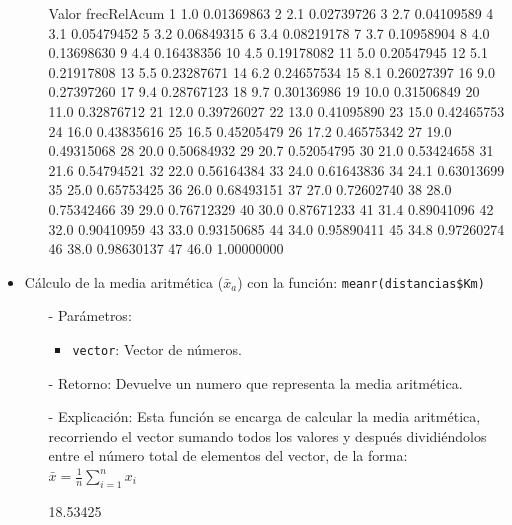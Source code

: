 \documentclass[a4paper, 12pt]{article}
\begin{document}
\begin{itemize}
\begin{itemize}
\begin{Schunk}
\begin{Soutput}
   Valor frecRelAcum
1    1.0  0.01369863
2    2.1  0.02739726
3    2.7  0.04109589
4    3.1  0.05479452
5    3.2  0.06849315
6    3.4  0.08219178
7    3.7  0.10958904
8    4.0  0.13698630
9    4.4  0.16438356
10   4.5  0.19178082
11   5.0  0.20547945
12   5.1  0.21917808
13   5.5  0.23287671
14   6.2  0.24657534
15   8.1  0.26027397
16   9.0  0.27397260
17   9.4  0.28767123
18   9.7  0.30136986
19  10.0  0.31506849
20  11.0  0.32876712
21  12.0  0.39726027
22  13.0  0.41095890
23  15.0  0.42465753
24  16.0  0.43835616
25  16.5  0.45205479
26  17.2  0.46575342
27  19.0  0.49315068
28  20.0  0.50684932
29  20.7  0.52054795
30  21.0  0.53424658
31  21.6  0.54794521
32  22.0  0.56164384
33  24.0  0.61643836
34  24.1  0.63013699
35  25.0  0.65753425
36  26.0  0.68493151
37  27.0  0.72602740
38  28.0  0.75342466
39  29.0  0.76712329
40  30.0  0.87671233
41  31.4  0.89041096
42  32.0  0.90410959
43  33.0  0.93150685
44  34.0  0.95890411
45  34.8  0.97260274
46  38.0  0.98630137
47  46.0  1.00000000
\end{Soutput}
\end{Schunk}
		\end{itemize}
		
		\item Cálculo de la media aritmética (\texttt{$\bar{x}_{a}$}) con la función: \texttt{meanr(distancias\$Km)}
		\begin{itemize}
			\item[-] Parámetros: 
			\begin{itemize}
				\item \texttt{vector}: Vector de números.
			\end{itemize}
			
			\item[-] Retorno: Devuelve un numero que representa la media aritmética.
			
			\item[-] Explicación: Esta función se encarga de calcular la media aritmética, recorriendo el vector sumando todos los valores y después dividiéndolos entre el número total de elementos del vector, de la forma: \\
			$\bar{x} = \frac{1}{n} \sum_{i=1}^{n} x_i$
\begin{Schunk}
\begin{Soutput}
[1] 18.53425
\end{Soutput}
\end{Schunk}
		\end{itemize}
		

\end{itemize}
\end{document}
